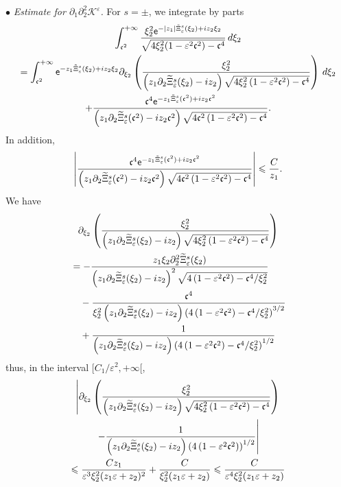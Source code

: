 \documentclass[10pt]{amsart}
\theoremstyle{definition}\newtheorem{defi}[theo]{Definition}\newtheorem{rema}[theo]{Remark}\newtheorem{exam}[theo]{Example}\newtheorem{exem}[theo]{Example}\newtheorem{nota}[theo]{Notation}
\newcommand*\p{\partial}
\newcommand*\BK{\mathcal{K}}
\newcommand*\ex{{\sf e}}
\newcommand*\cs{{\mathfrak c}}
\newcommand*\ii{\infty}
\newcommand*\ls{\leqslant }
\newcommand*\e{\varepsilon}
\renewcommand*\t{\tilde}
\let\oldtilde\tilde
\renewcommand*{\tilde}[1]{\mathchoice{\widetilde{#1}}{\widetilde{#1}}{\oldtilde{#1}}{\oldtilde{#1}}}
\begin{document}
$ \bullet $ \emph{Estimate for $ \p_1 \p_2^2 \BK^\e $.} For $ s = \pm $, we integrate by parts
\begin{multline}\label{IPP_K122_zero}
\int_{ \cs^2}^{+\ii} \frac{ \xi_2^2 \ex^{- |z_1| \t\Xi_\e^s (\xi_2) + i z_2 \xi_2} }{ \sqrt{ 4 \xi_2^2 (1 - \e^2 \cs^2) - \cs^4 } } \, d\xi_2\\  =
\int_{ \cs^2}^{+\ii} \ex^{- z_1 \t\Xi_\e^s (\xi_2) + i z_2 \xi_2 }
\p_{\xi_2} \left(\frac{ \xi_2^2 }{\left(z_1 \p_2 \t\Xi_\e^s (\xi_2) - i z_2\right) \sqrt{ 4 \xi_2^2 \left(1 - \e^2 \cs^2\right) - \cs^4 } } \right) \, d\xi_2\\
+ \frac{ \cs^4 \ex^{- z_1 \t\Xi_\e^s (\cs^2) + i z_2 \cs^2 } }{ \left(z_1 \p_2 \t\Xi_\e^s (\cs^2) - i z_2 \cs^2\right) \sqrt{ 4 \cs^2 \left(1 - \e^2 \cs^2\right) - \cs^4}}.
\end{multline}
In addition,
\begin{align*}
\left\lvert
\frac{ \cs^4 \ex^{- z_1 \t\Xi_\e^s (\cs^2) + i z_2 \cs^2} }{\left(z_1 \p_2 \t\Xi_\e^s (\cs^2) - i z_2 \cs^2\right)
\sqrt{ 4 \cs^2 \left(1 - \e^2 \cs^2\right) - \cs^4 } } \right\rvert
\ls \frac{C}{z_1 }.
\end{align*}
We have
\begin{multline*}
\p_{\xi_2} \left(\frac{ \xi_2^2 }{ \left(z_1 \p_2 \t\Xi_\e^s (\xi_2) - i z_2\right) \sqrt{ 4 \xi_2^2 \left(1 - \e^2 \cs^2\right) - \cs^4 } } \right)\\
\begin{aligned}
& = - \frac{ z_1 \xi_2 \p_2^2 \t\Xi_\e^s (\xi_2) }{ \left(z_1 \p_2 \t\Xi_\e^s (\xi_2) - i z_2\right)^2 \sqrt{ 4 \left(1 - \e^2 \cs^2\right) - \cs^4 / \xi_2^2} }
\\ & \quad - \frac{ \cs^4 }{ \xi_2^2 \left(z_1 \p_2 \t\Xi_\e^s (\xi_2) - i z_2\right) \left(4 \left(1 - \e^2 \cs^2\right) - \cs^4 /\xi_2^2\right)^{3/2} }
\\ & \quad + \frac{ 1 }{\left(z_1 \p_2 \t\Xi_\e^s (\xi_2) - i z_2\right)\left(4 \left(1 - \e^2 \cs^2\right) - \cs^4 /\xi_2^2\right)^{1/2} }
\end{aligned}
\end{multline*}
thus, in the interval $ [C_1 / \e^{2}, +\ii [$,
\begin{multline*}
\left\lvert  \p_{\xi_2} \left(\frac{ \xi_2^2 }{ \left(z_1 \p_2 \t\Xi_\e^s (\xi_2) - i z_2\right) \sqrt{ 4 \xi_2^2 \left(1 - \e^2 \cs^2\right) - \cs^4}} \right)\right.\\
\left. - \frac{ 1 }{\left(z_1 \p_2 \t\Xi_\e^s (\xi_2) - i z_2\right)\left(4\left(1 - \e^2 \cs^2\right)\right)^{1/2} }
\right\rvert
\\ 
\ls \frac{ C z_1 }{ \e^3 \xi_2^2 (z_1 \e + z_2)^2 } + \frac{ C }{ \xi_2^2 (z_1 \e + z_2) }
\ls \frac{ C }{ \e^4 \xi_2^2 (z_1 \e + z_2) }
\end{multline*}
\end{document}
